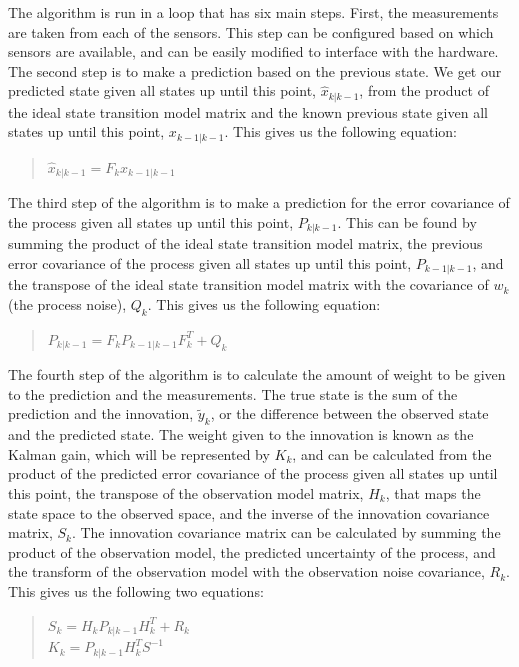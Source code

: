 \documentclass[onecolumn, draftclsnofoot,10pt, compsoc]{IEEEtran}
\begin{document}
The algorithm is run in a loop that has six main steps.
First, the measurements are taken from each of the sensors.
This step can be configured based on which sensors are available, and can be easily modified to interface with the hardware.
The second step is to make a prediction based on the previous state.
We get our predicted state given all states up until this point, $\hat{x}_{k|k-1}$, from the product of the ideal state transition model matrix and the known previous state given all states up until this point, $x_{k-1|k-1}$.
This gives us the following equation:
\begin{quote}
  $\hat{x}_{k|k-1} = F_kx_{k-1|k-1}$
\end{quote}

The third step of the algorithm is to make a prediction for the error covariance of the process given all states up until this point, $P_{k|k-1}$.
This can be found by summing the product of the ideal state transition model matrix, the previous error covariance of the process given all states up until this point, $P_{k-1|k-1}$, and the transpose of the ideal state transition model matrix with the covariance of $w_k$ (the process noise), $Q_k$.
This gives us the following equation:
\begin{quote}
  $P_{k|k-1} = F_kP_{k-1|k-1}F_k^T + Q_k$
\end{quote}

The fourth step of the algorithm is to calculate the amount of weight to be given to the prediction and the measurements.
The true state is the sum of the prediction and the innovation, $\tilde{y}_k$, or the difference between the observed state and the predicted state.
The weight given to the innovation is known as the Kalman gain, which will be represented by $K_k$, and can be calculated from the product of the predicted error covariance of the process given all states up until this point, the transpose of the observation model matrix, $H_k$, that maps the state space to the observed space, and the inverse of the innovation covariance matrix, $S_k$.
The innovation covariance matrix can be calculated by summing the product of the observation model, the predicted uncertainty of the process, and the transform of the observation model with the observation noise covariance, $R_k$.
This gives us the following two equations:
\begin{quote}
  $S_k = H_kP_{k|k-1}H_k^T + R_k$\\
  $K_k = P_{k|k-1}H_k^TS^{-1}$
\end{quote}
\end{document}

